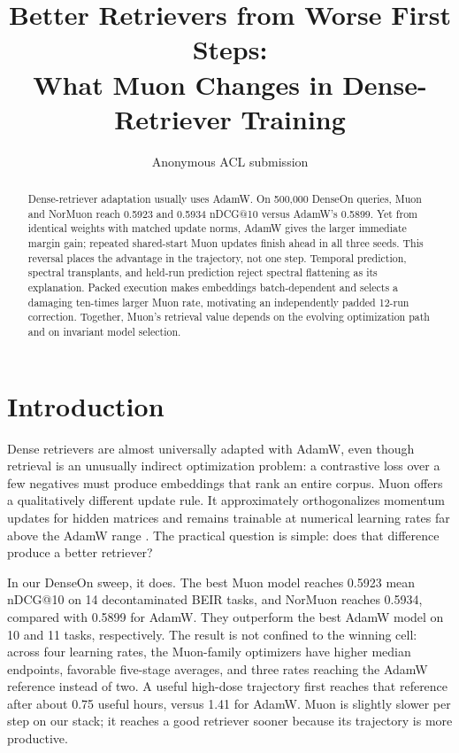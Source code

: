 \documentclass[11pt]{article}
\title{Better Retrievers from Worse First Steps:\\
What Muon Changes in Dense-Retriever Training}
\author{Anonymous ACL submission}
\begin{document}
\maketitle

\begin{abstract}
Dense-retriever adaptation usually uses AdamW. On 500,000 DenseOn queries, Muon and NorMuon reach
0.5923 and 0.5934 nDCG@10 versus AdamW's 0.5899. Yet from identical weights with matched update
norms, AdamW gives the larger immediate margin gain; repeated shared-start Muon updates finish ahead
in all three seeds. This reversal places the advantage in the trajectory, not one step. Temporal
prediction, spectral transplants, and held-run prediction reject spectral flattening as its
explanation. Packed execution makes embeddings batch-dependent and selects a damaging ten-times
larger Muon rate, motivating an independently padded 12-run correction.
\CorrectedAbstractFinding{} \StateOperatorAbstractFinding{} Together, Muon's retrieval value
depends on the evolving optimization path and on invariant model selection.
\end{abstract}

\section{Introduction}

Dense retrievers are almost universally adapted with AdamW, even though retrieval is an unusually
indirect optimization problem: a contrastive loss over a few negatives must produce embeddings that
rank an entire corpus. Muon offers a qualitatively different update rule. It approximately
orthogonalizes momentum updates for hidden matrices and remains trainable at numerical learning
rates far above the AdamW range \citep{loshchilov2019decoupled,liu2025muon}. The practical question
is simple: does that difference produce a better retriever?

In our DenseOn sweep, it does. The best Muon model reaches 0.5923 mean nDCG@10 on 14 decontaminated
BEIR tasks, and NorMuon reaches 0.5934, compared with 0.5899 for AdamW. They outperform the best
AdamW model on 10 and 11 tasks, respectively. The result is not confined to the winning cell: across
four learning rates, the Muon-family optimizers have higher median endpoints, favorable five-stage
averages, and three rates reaching the AdamW reference instead of two. A useful high-dose trajectory
first reaches that reference after about 0.75 useful hours, versus 1.41 for AdamW. Muon is slightly
slower per step on our stack; it reaches a good retriever sooner because its trajectory is more
productive.
\end{document}
